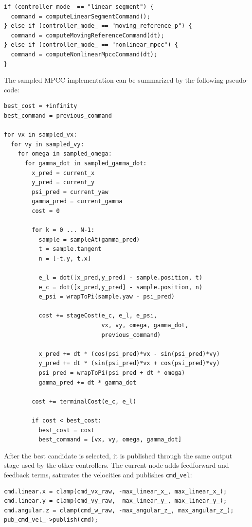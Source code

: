 \begin{verbatim}
if (controller_mode_ == "linear_segment") {
  command = computeLinearSegmentCommand();
} else if (controller_mode_ == "moving_reference_p") {
  command = computeMovingReferenceCommand(dt);
} else if (controller_mode_ == "nonlinear_mpcc") {
  command = computeNonlinearMpccCommand(dt);
}
\end{verbatim}

The sampled MPCC implementation can be summarized by the following pseudo-code:

\begin{verbatim}
best_cost = +infinity
best_command = previous_command

for vx in sampled_vx:
  for vy in sampled_vy:
    for omega in sampled_omega:
      for gamma_dot in sampled_gamma_dot:
        x_pred = current_x
        y_pred = current_y
        psi_pred = current_yaw
        gamma_pred = current_gamma
        cost = 0

        for k = 0 ... N-1:
          sample = sampleAt(gamma_pred)
          t = sample.tangent
          n = [-t.y, t.x]

          e_l = dot([x_pred,y_pred] - sample.position, t)
          e_c = dot([x_pred,y_pred] - sample.position, n)
          e_psi = wrapToPi(sample.yaw - psi_pred)

          cost += stageCost(e_c, e_l, e_psi,
                            vx, vy, omega, gamma_dot,
                            previous_command)

          x_pred += dt * (cos(psi_pred)*vx - sin(psi_pred)*vy)
          y_pred += dt * (sin(psi_pred)*vx + cos(psi_pred)*vy)
          psi_pred = wrapToPi(psi_pred + dt * omega)
          gamma_pred += dt * gamma_dot

        cost += terminalCost(e_c, e_l)

        if cost < best_cost:
          best_cost = cost
          best_command = [vx, vy, omega, gamma_dot]
\end{verbatim}

After the best candidate is selected, it is published through the same output
stage used by the other controllers.  The current node adds feedforward and
feedback terms, saturates the velocities and publishes \texttt{cmd\_vel}:

\begin{verbatim}
cmd.linear.x = clamp(cmd_vx_raw, -max_linear_x_, max_linear_x_);
cmd.linear.y = clamp(cmd_vy_raw, -max_linear_y_, max_linear_y_);
cmd.angular.z = clamp(cmd_w_raw, -max_angular_z_, max_angular_z_);
pub_cmd_vel_->publish(cmd);
\end{verbatim}

